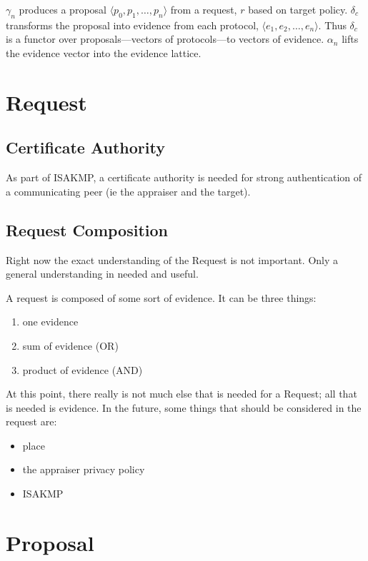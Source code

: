 \documentclass[10pt]{article}
\newcommand{\squash}{\itemsep=0pt\parskip=0pt}
\begin{document}
$\gamma_n$ produces a proposal $\langle p_0,p_1,\ldots,p_n\rangle$
from a request, $r$ based on target policy. $\delta_c$
transforms the proposal into evidence from each protocol,
$\langle e_1,e_2,\ldots,e_n \rangle$. Thus $\delta_c$ is a functor
over proposals---vectors of protocols---to vectors of evidence.
$\alpha_n$ lifts the evidence vector into the evidence lattice.

\section {Request}

\subsection {Certificate Authority}
  
  As part of ISAKMP, a certificate authority is needed for strong 
  authentication of a communicating peer (ie the appraiser and the
  target). 

\subsection {Request Composition}
  
  Right now the exact understanding of the Request is not important.
  Only a general understanding in needed and useful. 
  
  A request is composed of some sort of evidence. It can be three things:
  \begin{enumerate}
  \squash
  \item one evidence
  \item sum of evidence (OR)
  \item product of evidence (AND)
  \end{enumerate}

  
  At this point, there really is not much else that is needed for a Request; all that is needed is evidence. In the future, some things that should be considered in the request are:
  
  \begin{itemize}
   \squash
   \item place
   \item the appraiser privacy policy
   \item ISAKMP
  \end{itemize}

\section {Proposal}
\end{document}

